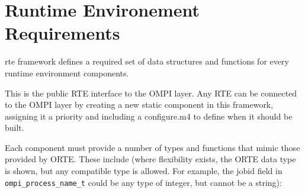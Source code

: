 \section{Runtime Environement Requirements}
\label{sec:requirements}
rte framework defines a required set of data structures and functions for every runtime environment components. 


\iffalse

This is the public RTE interface to the OMPI layer. Any RTE can be
 connected to the OMPI layer by creating a new static component in
 this framework, assigning it a priority and including a configure.m4
 to define when it should be built.

 Each component must provide a number of types and functions that mimic
 those provided by ORTE. These include (where flexibility exists, the
 ORTE data type is shown, but any compatible type is allowed. For example,
 the jobid field in \verb|ompi_process_name_t| could be any type of integer, but
 cannot be a string):

